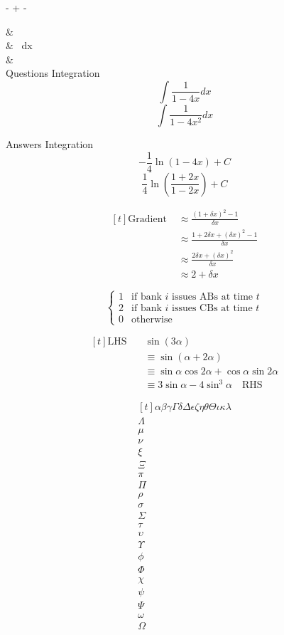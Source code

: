 
 -  + - 


& \\ 


& \ dx\\ 

&\\ 


Questions Integration
\[\int {\frac{1}{{1 - 4x}}dx} \]
\[\int {\frac{1}{{1 - 4{x^2}}}dx}\]

Answers Integration 
\[- \frac{1}{4}\ln \left( {1 - 4x} \right) + C\]
\[\frac{1}{4}\ln \left( {\frac{{1 + 2x}}{{1 - 2x}}} \right) + C\]



\[\begin{aligned}[t] 
\text{Gradient } &\approx \frac{(1+\delta{x})^2-1}{\delta{x}}\\ 
& \approx \frac{1+2\delta{x}+(\delta{x})^2 -1}{\delta{x}}\\ 
& \approx \frac{2\delta{x}+(\delta{x})^2}{\delta{x}}\\ 
&\approx 2+\delta{x} 
\end{aligned}\]




\[\begin{cases}
      1 & \text{if bank $i$ issues ABs at time $t$}\\
      2 & \text{if bank $i$ issues CBs at time $t$}\\
      0 & \text{otherwise}
    \end{cases}\]
	

\[\begin{aligned}[t]
\text{LHS } \ \ \ & \sin{(3\alpha)}\\
& \equiv \sin{(\alpha + 2\alpha)}\\
& \equiv \sin{\alpha}\cos{2\alpha}+\cos{\alpha}\sin{2\alpha}\\
& \equiv 3\sin{\alpha}-4\sin^3{\alpha} \ \ \ \text{ RHS}
\end{aligned}\]


\[\begin{aligned}[t]
\alpha
\beta
\gamma
\Gamma
\delta
\Delta
\epsilon
\zeta
\eta
\theta
\Theta
\iota
\kappa
\lambda\\
\Lambda\\
\mu\\
\nu\\
\xi\\
\Xi\\
\pi\\
\Pi\\
\rho\\
\sigma\\
\Sigma\\
\tau\\
\upsilon\\
\Upsilon\\
\phi\\
\Phi\\
\chi\\
\psi\\
\Psi\\
\omega\\
\Omega\\



\end{aligned}\]


